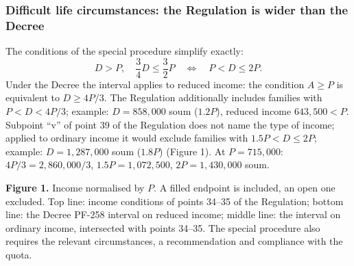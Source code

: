 \documentclass[14pt,a4paper]{extarticle}
\begin{document}
\subsubsection{Difficult life circumstances: the Regulation is wider than the Decree}\label{res:hard}
The conditions of the special procedure simplify exactly:
\begin{equation}
D>P,\quad\frac34D\le\frac32P\quad\Longleftrightarrow\quad P<D\le2P.
\end{equation}
Under the Decree the interval applies to reduced income: the condition $A\ge P$ is equivalent to $D\ge4P/3$. The Regulation additionally includes families with $P<D<4P/3$; example: $D=858{,}000$ soum ($1.2P$), reduced income $643{,}500<P$. Subpoint “v” of point 39 of the Regulation does not name the type of income; applied to ordinary income it would exclude families with $1.5P<D\le2P$; example: $D=1{,}287{,}000$ soum ($1.8P$) (Figure 1). At $P=715{,}000$: $4P/3=2{,}860{,}000/3$, $1.5P=1{,}072{,}500$, $2P=1{,}430{,}000$ soum.

\begin{center}
\end{center}
\textbf{Figure 1.} Income normalised by $P$. A filled endpoint is included, an open one excluded. Top line: income conditions of points 34–35 of the Regulation; bottom line: the Decree PF-258 interval on reduced income; middle line: the interval on ordinary income, intersected with points 34–35. The special procedure also requires the relevant circumstances, a recommendation and compliance with the quota.
\end{document}
